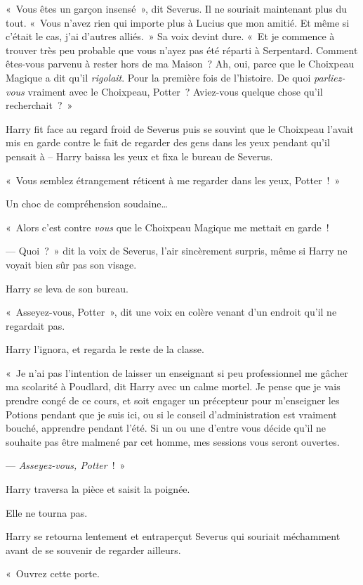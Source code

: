 «~Vous êtes un garçon insensé~», dit Severus. Il ne souriait maintenant plus du tout. «~Vous n'avez rien qui importe plus à Lucius que mon amitié. Et même si c'était le cas, j'ai d'autres alliés.~» Sa voix devint dure. «~Et je commence à trouver très peu probable que vous n'ayez pas été réparti à Serpentard. Comment êtes-vous parvenu à rester hors de ma Maison~? Ah, oui, parce que le Choixpeau Magique a dit qu'il \emph{rigolait}. Pour la première fois de l'histoire. De quoi \emph{parliez-vous} vraiment avec le Choixpeau, Potter~? Aviez-vous quelque chose qu'il recherchait~?~»

Harry fit face au regard froid de Severus puis se souvint que le Choixpeau l'avait mis en garde contre le fait de regarder des gens dans les yeux pendant qu'il pensait à -- Harry baissa les yeux et fixa le bureau de Severus.

«~Vous semblez étrangement réticent à me regarder dans les yeux, Potter~!~»

Un choc de compréhension soudaine…

«~Alors c'est contre \emph{vous} que le Choixpeau Magique me mettait en garde~!

--- Quoi~?~» dit la voix de Severus, l'air sincèrement surpris, même si Harry ne voyait bien sûr pas son visage.

Harry se leva de son bureau.

«~Asseyez-vous, Potter~», dit une voix en colère venant d'un endroit qu'il ne regardait pas.

Harry l'ignora, et regarda le reste de la classe.

«~Je n'ai pas l'intention de laisser un enseignant si peu professionnel me gâcher ma scolarité à Poudlard, dit Harry avec un calme mortel. Je pense que je vais prendre congé de ce cours, et soit engager un précepteur pour m'enseigner les Potions pendant que je suis ici, ou si le conseil d'administration est vraiment bouché, apprendre pendant l'été. Si un ou une d'entre vous décide qu'il ne souhaite pas être malmené par cet homme, mes sessions vous seront ouvertes.

--- \emph{Asseyez-vous, Potter}~!~»

Harry traversa la pièce et saisit la poignée.

Elle ne tourna pas.

Harry se retourna lentement et entraperçut Severus qui souriait méchamment avant de se souvenir de regarder ailleurs.

«~Ouvrez cette porte.

